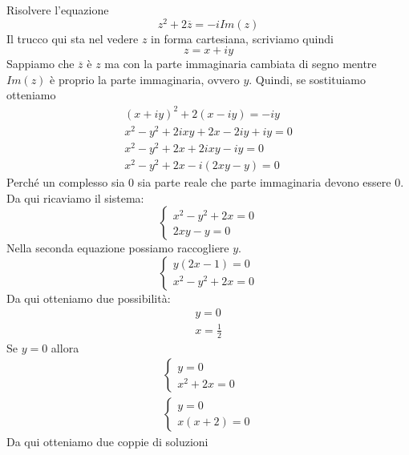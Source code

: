 \begin{example}
	Risolvere l'equazione
	\begin{equation*}
		z^2 + 2 \overline{z} = -i Im(z)
	\end{equation*}
	Il trucco qui sta nel vedere $z$ in forma cartesiana, scriviamo quindi
	\begin{equation*}
		z = x + iy
	\end{equation*}
	Sappiamo che $\overline{z}$ \`e $z$ ma con la parte immaginaria cambiata di segno mentre
	$Im(z)$ \`e proprio la parte immaginaria, ovvero $y$. Quindi, se sostituiamo otteniamo
	\begin{gather*}
		(x + iy)^2 + 2 (x - iy) = -i y       \\
		x^2 - y^2 + 2ixy + 2x - 2iy + iy = 0 \\
		x^2 - y^2 + 2x + 2ixy - iy = 0		 \\
		x^2 - y^2 + 2x - i(2xy - y) = 0
	\end{gather*}
	Perch\'e un complesso sia 0 sia parte reale che parte immaginaria devono essere 0. Da qui
	ricaviamo il sistema:
	\begin{equation*}
		\begin{cases}
			x^2 - y^2 + 2x = 0 \\
			2xy - y = 0
		\end{cases}
	\end{equation*}
	Nella seconda equazione possiamo raccogliere $y$.
	\begin{equation*}
		\begin{cases}
			y(2x - 1) = 0 \\
			x^2 - y^2 + 2x = 0
		\end{cases}
	\end{equation*}
	Da qui otteniamo due possibilit\`a:
	\begin{gather*}
		y = 0 			\\
		x = \frac{1}{2}
	\end{gather*}
	Se $y = 0$ allora
	\begin{gather*}
		\begin{cases}
			y = 0 \\
			x^2 + 2x = 0
		\end{cases} \\
		\begin{cases}
			y = 0 \\
			x (x + 2) = 0
		\end{cases}
	\end{gather*}
	Da qui otteniamo due coppie di soluzioni
	\begin{align*}

\end{align*}
\end{example}
